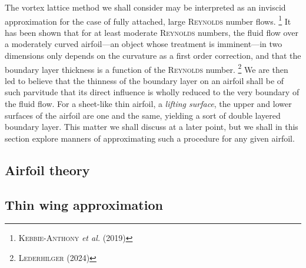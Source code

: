 The vortex lattice method we shall consider may be interpreted as an inviscid approximation for the case of fully attached, large \textsc{Reynolds} number flows.%
\footnote{%
  \cite{kebbie-athony2019fast} \textsc{Kebbie-Anthony} \emph{et al.} (2019)
}
It has been shown that for at least moderate \textsc{Reynolds} numbers, the fluid flow over a moderately curved airfoil---an object whose treatment is imminent---in two dimensions only depends on the curvature as a first order correction, and that the boundary layer thickness is a function of the \textsc{Reynolds} number.%
\footnote{%
  \cite{lederhilger2024boundary} \textsc{Lederhilger} (2024)
}
We are then led to believe that the thinness of the boundary layer on an airfoil shall be of such parvitude that its direct influence is wholly reduced to the very boundary of the fluid flow.
For a sheet-like thin airfoil, a \emph{lifting surface}, the upper and lower surfaces of the airfoil are one and the same, yielding a sort of double layered boundary layer.
This matter we shall discuss at a later point, but we shall in this section explore manners of approximating such a procedure for any given airfoil.

\subsection{Airfoil theory}


\subsection{Thin wing approximation}

